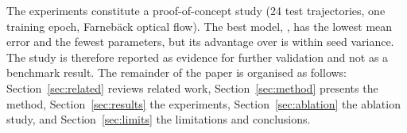 The experiments constitute a proof-of-concept study (24 test trajectories, one training epoch, Farneb\"ack optical flow). The best model, \CAMTNS, has the lowest mean error and the fewest parameters, but its advantage over \CAMTN is within seed variance. The study is therefore reported as evidence for further validation and not as a benchmark result. The remainder of the paper is organised as follows: Section~\ref{sec:related} reviews related work, Section~\ref{sec:method} presents the method, Section~\ref{sec:results} the experiments, Section~\ref{sec:ablation} the ablation study, and Section~\ref{sec:limits} the limitations and conclusions.
